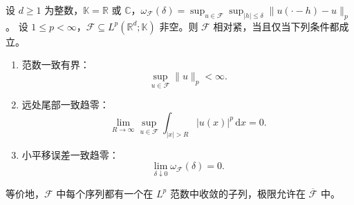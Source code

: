 \begin{theorem}\label{b1:thm:frechet-kolmogorov-lp}
设 \(d\geq1\) 为整数，\(\mathbb K=\mathbb R\) 或 \(\mathbb C\)，\(\omega_{\mathcal F}(\delta)=\sup_{u\in\mathcal F}\sup_{|h|\leq\delta}\|u(\cdot-h)-u\|_p\)。
设 \(1\leq p<\infty\)，\(\mathcal F\subseteq L^p(\mathbb R^d;\mathbb K)\) 非空。则 \(\mathcal F\) 相对紧，当且仅当下列条件都成立。
\begin{enumerate}
\item\label{b1:item:fk-bounded}
范数一致有界：
\[
 \sup_{u\in\mathcal F}\|u\|_p<\infty.
\]
\item\label{b1:item:fk-tail}
远处尾部一致趋零：
\[
 \lim_{R\to\infty}\sup_{u\in\mathcal F}
       \int_{|x|>R}|u(x)|^p\,\mathrm dx=0.
\]
\item\label{b1:item:fk-translation}
小平移误差一致趋零：
\[
 \lim_{\delta\downarrow0}\omega_{\mathcal F}(\delta)=0.
\]
\end{enumerate}
等价地，\(\mathcal F\) 中每个序列都有一个在 \(L^p\) 范数中收敛的子列，极限允许在 \(\overline{\mathcal F}\) 中。
\end{theorem}
